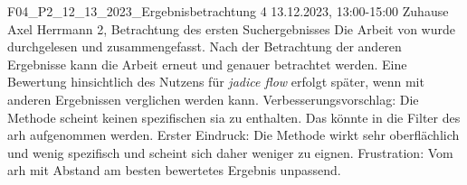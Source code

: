 \fieldnote
{F04\_P2\_12\_13\_2023\_Ergebnisbetrachtung}
{4}
{13.12.2023, 13:00-15:00}
{Zuhause}
{Axel Herrmann}
{2, Betrachtung des ersten Suchergebnisses}
{
	Die Arbeit von  wurde durchgelesen und zusammengefasst.
}
{
	Nach der Betrachtung der anderen Ergebnisse kann die Arbeit erneut und genauer betrachtet werden.
	Eine Bewertung hinsichtlich des Nutzens für \emph{jadice flow} erfolgt später, wenn mit anderen Ergebnissen verglichen werden kann.
  Verbesserungsvorschlag: Die Methode scheint keinen spezifischen \gls{sia} zu enthalten. Das könnte in die Filter des \gls{arh} aufgenommen werden.
}
{
}
{
  Erster Eindruck: Die Methode wirkt sehr oberflächlich und wenig spezifisch und scheint sich daher weniger zu eignen.
}
{
  Frustration: Vom \gls{arh} mit Abstand am besten bewertetes Ergebnis unpassend.
}
